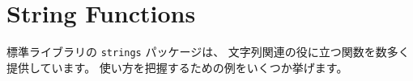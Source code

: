 \section{String Functions}

標準ライブラリの \texttt{strings} パッケージは、 文字列関連の役に立つ関数を数多く提供しています。 使い方を把握するための例をいくつか挙げます。




